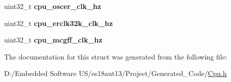 \begin{DoxyCompactItemize}
\item 
\hypertarget{struct_t_cpu_clock_configuration_a8573f3896f85f97201ef2d6252d99905}{}uint32\+\_\+t {\bfseries cpu\+\_\+oscer\+\_\+clk\+\_\+hz}\label{struct_t_cpu_clock_configuration_a8573f3896f85f97201ef2d6252d99905}

\item 
\hypertarget{struct_t_cpu_clock_configuration_a3f68e3893f7dec551e938a909929687b}{}uint32\+\_\+t {\bfseries cpu\+\_\+erclk32k\+\_\+clk\+\_\+hz}\label{struct_t_cpu_clock_configuration_a3f68e3893f7dec551e938a909929687b}

\item 
\hypertarget{struct_t_cpu_clock_configuration_a5bd9b1235d0f85073ed01c126782d898}{}uint32\+\_\+t {\bfseries cpu\+\_\+mcgff\+\_\+clk\+\_\+hz}\label{struct_t_cpu_clock_configuration_a5bd9b1235d0f85073ed01c126782d898}

\end{DoxyCompactItemize}


The documentation for this struct was generated from the following file\+:\begin{DoxyCompactItemize}
\item 
D\+:/\+Embedded Software U\+S/es18aut13/\+Project/\+Generated\+\_\+\+Code/\hyperlink{_cpu_8h}{Cpu.\+h}\end{DoxyCompactItemize}
